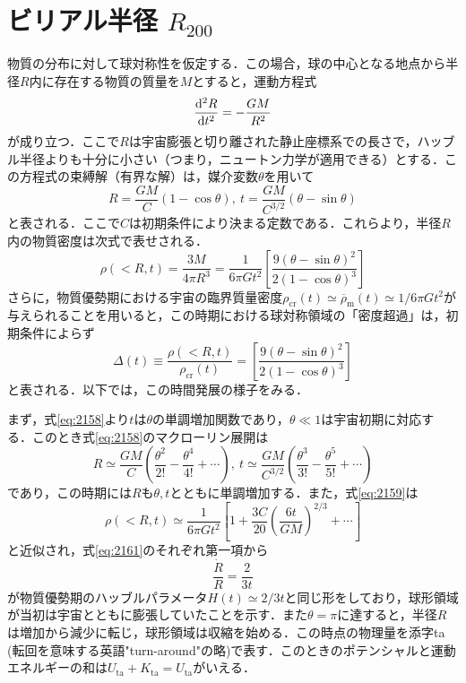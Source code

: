 \section{ビリアル半径 $R_{200}$}

物質の分布に対して球対称性を仮定する．この場合，球の中心となる地点から半径$R$内に存在する物質の質量を$M$とすると，運動方程式
\begin{equation}
	\dv[2]{R}{t} = - \frac{GM}{R^2}
\end{equation}
が成り立つ．ここで$R$は宇宙膨張と切り離された静止座標系での長さで，ハッブル半径よりも十分に小さい（つまり，ニュートン力学が適用できる）とする．この方程式の束縛解（有界な解）は，媒介変数$\theta$を用いて
\begin{equation}
	R=\frac{GM}{C}(1-\cos\theta),\ t = \frac{GM}{C^{3/2}}(\theta - \sin\theta) \label{eq:2158}
\end{equation}
と表される．ここで$C$は初期条件により決まる定数である．これらより，半径$R$内の物質密度は次式で表せされる．
\begin{equation}
	\rho(<R,t) = \frac{3M}{4\pi R^3} = \frac{1}{6\pi Gt^2} \left[ \frac{9(\theta - \sin\theta)^2}{2(1-\cos\theta)^3} \right] \label{eq:2159}
\end{equation}
さらに，物質優勢期における宇宙の臨界質量密度$ \rho_\text{cr}(t) \simeq \overline{\rho}_\text{m}(t) \simeq 1/{6\pi Gt^2}$が与えられることを用いると，この時期における球対称領域の「密度超過」は，初期条件によらず
\begin{equation}
	\Delta(t) \equiv \frac{\rho(<R,t)}{\rho_\text{cr}(t)} = \left[\frac{9(\theta - \sin\theta)^2}{2(1-\cos\theta)^3}\right]
\end{equation}
と表される．以下では，この時間発展の様子をみる．

まず，式\eqref{eq:2158}より$t$は$\theta$の単調増加関数であり，$\theta \ll 1$は宇宙初期に対応する．このとき式\eqref{eq:2158}のマクローリン展開は
\begin{equation}
	R \simeq \frac{GM}{C} \left( \frac{\theta^2}{2!} - \frac{\theta^4}{4!} + \cdots \right), \ t \simeq \frac{GM}{C^{3/2}} \left( \frac{\theta^3}{3!} - \frac{\theta^5}{5!} + \cdots \right)
\end{equation}
であり，この時期には$R$も$\theta,t$とともに単調増加する．また，式\eqref{eq:2159}は
\begin{equation}
	\rho(<R, t) \simeq \frac{1}{6 \pi G t^2} \left[ 1 + \frac{3C}{20}\left( \frac{6t}{GM} \right)^{2/3} + \cdots \right] \label{eq:2161}
\end{equation}
と近似され，式\eqref{eq:2161}のそれぞれ第一項から
\begin{equation}
	\frac{\dot{R}}{R} = \frac{2}{3t}
\end{equation}
が物質優勢期のハッブルパラメータ$H(t) \simeq 2/3t$と同じ形をしており，球形領域が当初は宇宙とともに膨張していたことを示す．また$\theta = \pi$に達すると，半径$R$は増加から減少に転じ，球形領域は収縮を始める．この時点の物理量を添字ta (転回を意味する英語"turn-around"の略)で表す．このときのポテンシャルと運動エネルギーの和は$U_\text{ta}+K_\text{ta} = U_\text{ta}$がいえる．

